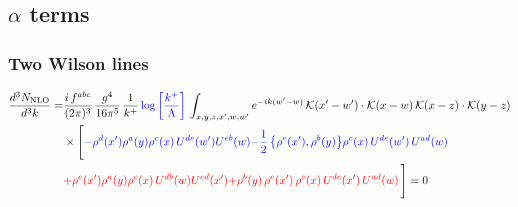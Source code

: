 \documentclass[9pt]{article}
\numberwithin{equation}{section}
\begin{document}
\subsection{$\alpha$ terms}
\subsubsection{Two Wilson lines}
\begin{align}
\frac{d^{3}N_{\rm NLO}}{d^{3}k}= & \frac{i\,f^{abc}}{(2\pi)^{3}}\,\frac{g^{4}}{16\pi^{5}}\,\frac{1}{k^{+}}\,{\color{blue}\log{\left[\frac{k^{+}}{\Lambda}\right]}}\,\int_{x,y,z,x',w,w'}e^{-ik(w'-w)}\,\mathcal{K}(x'-w')\cdot\mathcal{K}(x-w)\,\mathcal{K}(x-z)\cdot\mathcal{K}(y-z)\notag\\
&\times\Bigg[{\color{blue}-\rho^{d}(x') \rho^{a}(y) \rho^{c}(x)\,U^{d e}(w') U^{e b}(w)}{\color{blue}-\frac{1}{2}\,\big\{\rho^{e}(x'),\rho^{b}(y)\big\}\rho^{c}(x)\,U^{de}(w')\,U^{ad}(w)}\notag \\ & {\color{red}+\rho^{e}(x') \rho^{a}(y) \rho^{c}(x)\, U^{d b}(w) U^{e d}(x')}{\color{red}+\rho^{b}(y)\,\rho^{e}(x')\,\rho^{c}(x)\,U^{de}(x')\,U^{ad}(w)}\,\Bigg] = 0
\end{align}
\end{document}
